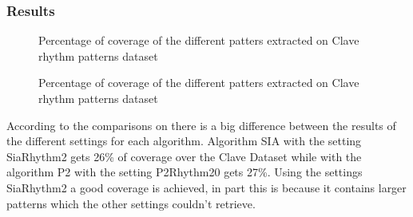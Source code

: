 \documentclass{article}
\begin{document}
\subsubsection{Results}

\begin{figure}
 \centerline{}
 \caption{Percentage of coverage of the different patters extracted on Clave rhythm patterns dataset}
 \label{rhythmcover}
\end{figure}

\begin{figure}
 \centerline{}
 \caption{Percentage of coverage of the different patters extracted on Clave rhythm patterns dataset}
 \label{rhythmcount}
\end{figure}

According to the comparisons on  there is a big difference between the results of the different settings for each algorithm. Algorithm SIA with the setting SiaRhythm2 gets 26\% of coverage over the Clave Dataset while with the algorithm P2 with the setting P2Rhythm20 gets 27\%. Using the settings SiaRhythm2 a good coverage is achieved, in part this is because it contains larger patterns which the other settings couldn’t retrieve.
\end{document}
